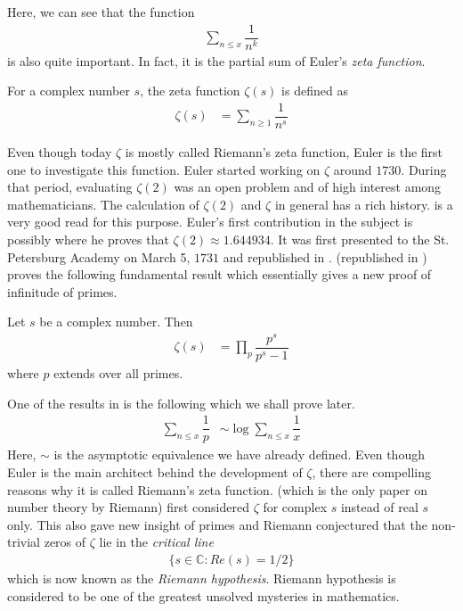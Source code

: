 \documentclass[elemannt.tex]{subfile}
\begin{document}
	Here, we can see that the function
		\begin{align*}
			\sum_{n\leq x}\dfrac{1}{n^{k}}
		\end{align*}
	is also quite important. In fact, it is the partial sum of Euler's \textit{zeta function}.
		\begin{definition}
			For a complex number $s$, the zeta function $\zeta(s)$ is defined as
				\begin{align*}
					\zeta(s)
						& = \sum_{n\geq 1}\dfrac{1}{n^{s}}
				\end{align*}
		\end{definition}
	Even though today $\zeta$ is mostly called Riemann's zeta function, Euler is the first one to investigate this function. Euler started working on $\zeta$ around $1730$. During that period, evaluating $\zeta(2)$ was an open problem and of high interest among mathematicians. The calculation of $\zeta(2)$ and $\zeta$ in general has a rich history. \textcite{ayoub_1974} is a very good read for this purpose. Euler's first contribution in the subject is possibly \textcite{euler_1738} where he proves that $\zeta(2)\approx 1.644934$. It was first presented to the St. Petersburg Academy on March 5, $1731$ and republished in \textcite{euler_2020_a}. \textcite{euler_1744} (republished in \textcite{euler_2020_b}) proves the following fundamental result which essentially gives a new proof of infinitude of primes.
		\begin{theorem}
			Let $s$ be a complex number. Then
				\begin{align*}
					\zeta(s)
						& = \prod_{p}\dfrac{p^{s}}{p^{s}-1}
				\end{align*}
			where $p$ extends over all primes.
		\end{theorem}
	One of the results in \textcite{euler_1744} is the following which we shall prove later.
		\begin{align*}
			\sum_{n\leq x}\dfrac{1}{p}
				& \sim \log{\sum_{n\leq x}\dfrac{1}{x}}
		\end{align*}
	Here, $\sim$ is the asymptotic equivalence we have already defined. Even though Euler is the main architect behind the development of $\zeta$, there are compelling reasons why it is called Riemann's zeta function. \textcite{riemann_1859} (which is the only paper on number theory by Riemann) first considered $\zeta$ for complex $s$ instead of real $s$ only. This also gave new insight of primes and Riemann conjectured that the non-trivial zeros of $\zeta$ lie in the \textit{critical line}
		\begin{align*}
			\{s\in\mathbb{C}:Re(s)=1/2\}
		\end{align*}
	which is now known as the \textit{Riemann hypothesis}. Riemann hypothesis is considered to be one of the greatest unsolved mysteries in mathematics. 
	
\end{document}
